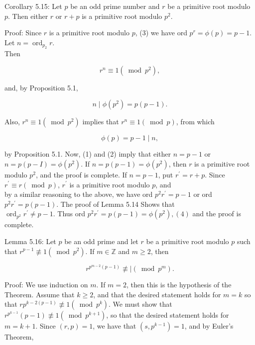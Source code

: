 \documentclass[10pt]{article}
\begin{document}
Corollary 5.15: Let $p$ be an odd prime number and $r$ be a primitive root modulo $p$. Then either $r$ or $r+p$ is a primitive root modulo $p^{2}$.

Proof: Since $r$ is a primitive root modulo $p$, (3) we have ord $p^{r}=\phi(p)=p-1$. Let $n=\operatorname{ord}_{p_{2}} r$.\\
Then

$$
r^{n} \equiv 1\left(\bmod p^{2}\right),
$$

and, by Proposition 5.1,


\begin{equation*}
n \mid \phi\left(p^{2}\right)=p(p-1) . \tag{1}
\end{equation*}


Also, $r^{n} \equiv 1\left(\bmod p^{2}\right)$ implies that $r^{n} \equiv 1(\bmod p)$, from which


\begin{equation*}
\phi(p)=p-1 \mid n, \tag{2}
\end{equation*}


by Proposition 5.1. Now, (1) and (2) imply that either $n=p-1$ or $n=p(p-I)=\phi\left(p^{2}\right)$. If $n=p(p-1)=\phi\left(p^{2}\right)$, then $r$ is a primitive root modulo $p^{2}$, and the proof is complete. If $n=p-1$, put $r^{\prime}=r+p$. Since $r^{\prime} \equiv r(\bmod p)$, $r^{\prime}$ is a primitive root modulo $p$, and\\
by a similar reasoning to the above, we have ord $p^{2} r^{\prime}=p-1$ or ord $p^{2} r^{\prime}=p(p-1)$. The proof of Lemma 5.14 Shows that\\
$\operatorname{ord}_{p^{2}} r^{\prime} \neq p-1$. Thus ord $p^{2} r^{\prime}=p(p-1)=\phi\left(p^{2}\right),(4)$ and the proof is complete.

Lemma 5.16: Let $p$ be an odd prime and let $r$ be a primitive root modulo $p$ such that $r^{p-1} \not \equiv 1\left(\bmod p^{2}\right)$. If $m \in \mathbb{Z}$ and $m \geqslant 2$, then

$$
r^{p^{m-2}(p-1)} \not \equiv \mid\left(\bmod p^{m}\right) .
$$

Proof: We use induction on $m$. If $m=2$, then this is the hypothesis of the Theorem. Assume that $k \geqslant 2$, and that the desired statement holds for $m=k$ so that $r p^{k-2(p-1)} \not \equiv 1\left(\bmod p^{k}\right)$. We must show that $r^{p^{k-1}}(p-1) \not \equiv 1\left(\bmod p^{k+1}\right)$, so that the desired statement holds for $m=k+1$. Since $(r, p)=1$, we have that $\left(s, p^{k-1}\right)=1$, and by Euler's Theorem,
\end{document}
